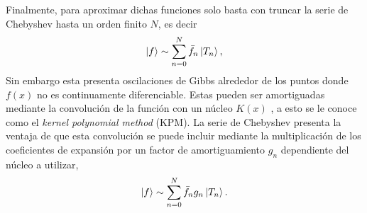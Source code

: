 Finalmente, para aproximar dichas funciones solo basta con truncar la serie de Chebyshev
hasta un orden finito $N$, es decir
\begin{equation*}\label{eq:truncChebyshev}
	\ket{f} \sim \sum_{n=0}^N \bar{f}_n \ket{T_n},
\end{equation*}
Sin embargo esta presenta oscilaciones de Gibbs alrededor de los puntos donde $f(x)$ 
no es continuamente diferenciable.
Estas pueden ser amortiguadas mediante la convolución de la función con un núcleo 
$K(x)$ \autocite{Weise2006}, a esto se le conoce como el \emph{kernel polynomial method} (KPM). 
La serie de Chebyshev presenta la ventaja de que esta convolución 
se puede incluir mediante la multiplicación de los coeficientes de expansión por un factor de
amortiguamiento $g_n$ dependiente del núcleo a utilizar,
\begin{equation}\label{eq:kpm}
	\ket{f} \sim \sum_{n=0}^N \bar{f}_n g_n \ket{T_n}.
\end{equation}
